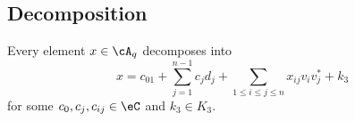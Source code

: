 \subsection{Decomposition}

\begin{proposition}
	Every element $x\in\cA_q$ decomposes into
	\begin{equation}
		x=c_01+\sum_{j=1}^{n-1}c_jd_j+\sum_{1\leq i\leq j\leq n}x_{ij}v_iv_j^*+k_3
	\end{equation}
	for some $c_0,c_j,c_{ij}\in \eC$ and $k_3\in K_3$.
\end{proposition}

